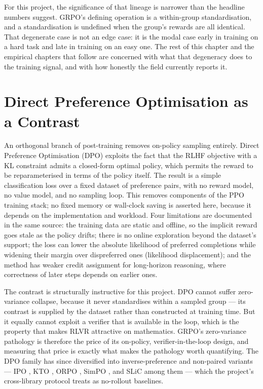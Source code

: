 \documentclass[12pt,a4paper]{report}
\begin{document}
For this project, the significance of that lineage is narrower than the
headline numbers suggest. GRPO's defining operation is a within-group
standardisation, and a standardisation is undefined when the group's
rewards are all identical. That degenerate case is not an edge case: it
is the modal case early in training on a hard task and late in training
on an easy one. The rest of this chapter and the empirical chapters that
follow are concerned with what that degeneracy does to the training
signal, and with how honestly the field currently reports it.

\section{Direct Preference Optimisation as a
Contrast}\label{direct-preference-optimisation-as-a-contrast}

An orthogonal branch of post-training removes on-policy sampling
entirely. Direct Preference Optimisation (DPO) \citep{rafailov2023dpo}
exploits the fact that the RLHF objective with a KL constraint admits a
closed-form optimal policy, which permits the reward to be
reparameterised in terms of the policy itself. The result is a simple
classification loss over a fixed dataset of preference pairs, with no
reward model, no value model, and no sampling loop. This removes
components of the PPO training stack; no fixed memory or wall-clock
saving is asserted here, because it depends on the implementation and
workload. Four limitations are documented in the same source: the
training data are static and offline, so the implicit reward goes stale
as the policy drifts; there is no online exploration beyond the
dataset's support; the loss can lower the absolute likelihood of
preferred completions while widening their margin over dispreferred ones
(likelihood displacement); and the method has weaker credit assignment
for long-horizon reasoning, where correctness of later steps depends on
earlier ones.

The contrast is structurally instructive for this project. DPO cannot
suffer zero-variance collapse, because it never standardises within a
sampled group --- its contrast is supplied by the dataset rather than
constructed at training time. But it equally cannot exploit a verifier
that is available in the loop, which is the property that makes RLVR
attractive on mathematics. GRPO's zero-variance pathology is therefore
the price of its on-policy, verifier-in-the-loop design, and measuring
that price is exactly what makes the pathology worth quantifying. The
DPO family has since diversified into inverse-preference and non-paired
variants --- IPO \citep{azar2023ipo}, KTO \citep{ethayarajh2024kto},
ORPO \citep{hong2024orpo}, SimPO \citep{meng2024simpo}, and SLiC
\citep{zhao2023slichf} among them --- which the project's cross-library
protocol treats as no-rollout baselines.
\end{document}

